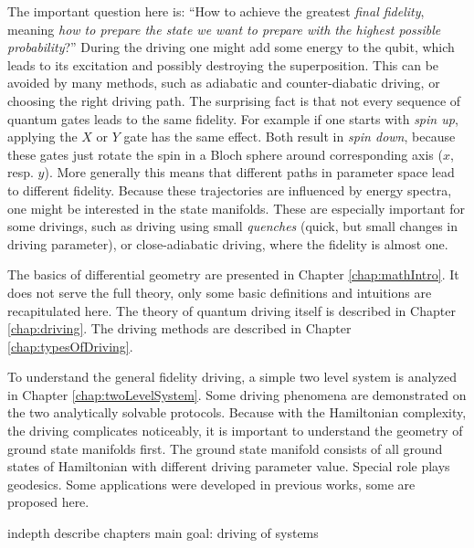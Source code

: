 The important question here is: “How to achieve the greatest \emph{final fidelity}, meaning \emph{how to prepare the state we want to prepare with the highest possible probability}?” During the driving one might add some energy to the qubit, which leads to its excitation and possibly destroying the superposition. This can be avoided by many methods, such as adiabatic and counter-diabatic driving, or choosing the right  driving path. The surprising fact is that not every sequence of quantum gates leads to the same fidelity. For example if one starts with \emph{spin up}, applying the $X$ or $Y$ gate has the same effect. Both result in \emph{spin down}, because these gates just rotate the spin in a Bloch sphere around corresponding axis ($x$, resp. $y$). More generally this means that different paths in parameter space lead to different fidelity. Because these trajectories are influenced by energy spectra, one might be interested in the state manifolds. These are especially important for some drivings, such as driving using small \emph{quenches} (quick, but small changes in driving parameter), or close-adiabatic driving, where the fidelity is almost one.


The basics of differential geometry are presented in Chapter \ref{chap:mathIntro}. It does not serve the full theory, only some basic definitions and intuitions are recapitulated here. The theory of quantum driving itself is described in Chapter \ref{chap:driving}. 
The driving methods are described in Chapter \ref{chap:typesOfDriving}. 

To understand the general fidelity driving, a simple two level system is analyzed in Chapter \ref{chap:twoLevelSystem}. Some driving phenomena are demonstrated on the two analytically solvable protocols. Because with the Hamiltonian complexity, the driving complicates noticeably, it is important to understand the geometry of ground state manifolds first. The ground state manifold consists of all ground states of Hamiltonian with different driving parameter value. Special role plays geodesics. Some applications were developed in previous works, some are proposed here.


indepth describe chapters
main goal: driving of systems